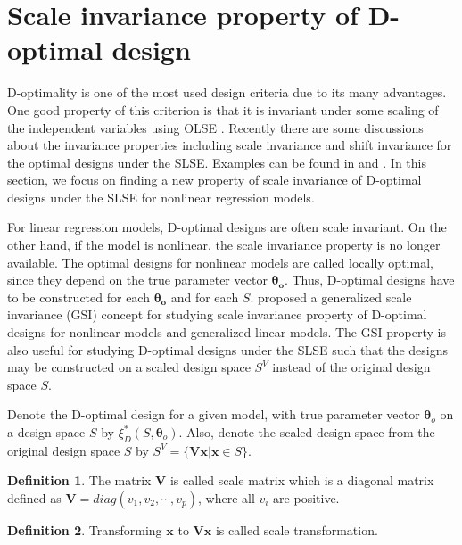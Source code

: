 \documentclass[
]{book}
\theoremstyle{definition}
\newtheorem{definition}{Definition}[chapter]
\theoremstyle{definition}
\theoremstyle{definition}
\theoremstyle{definition}
\theoremstyle{remark}
\begin{document}
\section{Scale invariance property of D-optimal design}\label{scale-invariance-property-of-d-optimal-design}

D-optimality is one of the most used design criteria due to its many advantages. One good property of this criterion is that it is invariant under some scaling of the independent variables using OLSE \citep{berger2009introduction}. Recently there are some discussions about the invariance properties including scale invariance and shift invariance for the optimal designs under the SLSE. Examples can be found in \citet{gao2014new} and \citet{yin2018optimal}. In this section, we focus on finding a new property of scale invariance of D-optimal designs under the SLSE for nonlinear regression models.

For linear regression models, D-optimal designs are often scale invariant. On the other hand, if the model is nonlinear, the scale invariance property is no longer available. The optimal designs for nonlinear models are called locally optimal, since they depend on the true parameter vector \(\boldsymbol{\theta_o}\). Thus, D-optimal designs have to be constructed for each \(\boldsymbol{\theta_o}\) and for each \(S\). \citet{wong2019cvx} proposed a generalized scale invariance (GSI) concept for studying scale invariance property of D-optimal designs for nonlinear models and generalized linear models. The GSI property is also useful for studying D-optimal designs under the SLSE such that the designs may be constructed on a scaled design space \(S^V\) instead of the original design space \(S\).

Denote the D-optimal design for a given model, with true parameter vector \(\boldsymbol{\theta}_o\) on a design space \(S\) by \(\xi_D^*(S,\boldsymbol{\theta}_o)\). Also, denote the scaled design space from the original design space \(S\) by \(S^{V}=\{\boldsymbol{V}\boldsymbol{x}|\boldsymbol{x}\in S\}\).

\begin{definition}
\protect\hypertarget{def:scale-matrix}{}\label{def:scale-matrix}The matrix \(\boldsymbol{V}\) is called scale matrix which is a diagonal matrix defined as \(\boldsymbol{V}=diag(v_1,v_2,\cdots,v_p)\), where all \(v_i\) are positive.
\end{definition}

\begin{definition}
\protect\hypertarget{def:scale-invariant}{}\label{def:scale-invariant}Transforming \(\boldsymbol{x}\) to \(\boldsymbol{V} \boldsymbol{x}\) is called scale transformation.
\end{definition}
\end{document}

